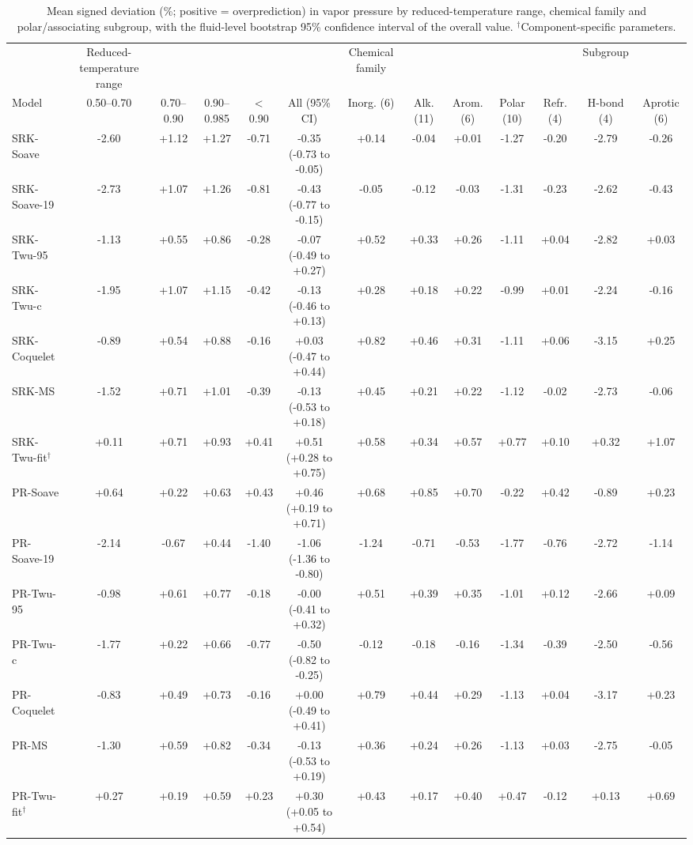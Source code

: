 \begin{table}[H]
\centering
\caption{Mean signed deviation (\%; positive = overprediction) in vapor pressure by reduced-temperature range, chemical family and polar/associating subgroup, with the fluid-level bootstrap 95\% confidence interval of the overall value. $^{\dagger}$Component-specific parameters.}
\label{tab:tabS_signed_psat}
\small
\begin{tabular}{lcccccccccccc}
\toprule
 & Reduced-temperature range &  &  &  &  & Chemical family &  &  &  &  & Subgroup &  \\
Model & 0.50--0.70 & 0.70--0.90 & 0.90--0.985 & < 0.90 & All (95\% CI) & Inorg. (6) & Alk. (11) & Arom. (6) & Polar (10) & Refr. (4) & H-bond (4) & Aprotic (6) \\
\midrule
SRK-Soave & -2.60 & +1.12 & +1.27 & -0.71 & -0.35 (-0.73 to -0.05) & +0.14 & -0.04 & +0.01 & -1.27 & -0.20 & -2.79 & -0.26 \\
SRK-Soave-19 & -2.73 & +1.07 & +1.26 & -0.81 & -0.43 (-0.77 to -0.15) & -0.05 & -0.12 & -0.03 & -1.31 & -0.23 & -2.62 & -0.43 \\
SRK-Twu-95 & -1.13 & +0.55 & +0.86 & -0.28 & -0.07 (-0.49 to +0.27) & +0.52 & +0.33 & +0.26 & -1.11 & +0.04 & -2.82 & +0.03 \\
SRK-Twu-c & -1.95 & +1.07 & +1.15 & -0.42 & -0.13 (-0.46 to +0.13) & +0.28 & +0.18 & +0.22 & -0.99 & +0.01 & -2.24 & -0.16 \\
SRK-Coquelet & -0.89 & +0.54 & +0.88 & -0.16 & +0.03 (-0.47 to +0.44) & +0.82 & +0.46 & +0.31 & -1.11 & +0.06 & -3.15 & +0.25 \\
SRK-MS & -1.52 & +0.71 & +1.01 & -0.39 & -0.13 (-0.53 to +0.18) & +0.45 & +0.21 & +0.22 & -1.12 & -0.02 & -2.73 & -0.06 \\
SRK-Twu-fit$^{\dagger}$ & +0.11 & +0.71 & +0.93 & +0.41 & +0.51 (+0.28 to +0.75) & +0.58 & +0.34 & +0.57 & +0.77 & +0.10 & +0.32 & +1.07 \\
\midrule
PR-Soave & +0.64 & +0.22 & +0.63 & +0.43 & +0.46 (+0.19 to +0.71) & +0.68 & +0.85 & +0.70 & -0.22 & +0.42 & -0.89 & +0.23 \\
PR-Soave-19 & -2.14 & -0.67 & +0.44 & -1.40 & -1.06 (-1.36 to -0.80) & -1.24 & -0.71 & -0.53 & -1.77 & -0.76 & -2.72 & -1.14 \\
PR-Twu-95 & -0.98 & +0.61 & +0.77 & -0.18 & -0.00 (-0.41 to +0.32) & +0.51 & +0.39 & +0.35 & -1.01 & +0.12 & -2.66 & +0.09 \\
PR-Twu-c & -1.77 & +0.22 & +0.66 & -0.77 & -0.50 (-0.82 to -0.25) & -0.12 & -0.18 & -0.16 & -1.34 & -0.39 & -2.50 & -0.56 \\
PR-Coquelet & -0.83 & +0.49 & +0.73 & -0.16 & +0.00 (-0.49 to +0.41) & +0.79 & +0.44 & +0.29 & -1.13 & +0.04 & -3.17 & +0.23 \\
PR-MS & -1.30 & +0.59 & +0.82 & -0.34 & -0.13 (-0.53 to +0.19) & +0.36 & +0.24 & +0.26 & -1.13 & +0.03 & -2.75 & -0.05 \\
PR-Twu-fit$^{\dagger}$ & +0.27 & +0.19 & +0.59 & +0.23 & +0.30 (+0.05 to +0.54) & +0.43 & +0.17 & +0.40 & +0.47 & -0.12 & +0.13 & +0.69 \\
\bottomrule
\end{tabular}
\end{table}
